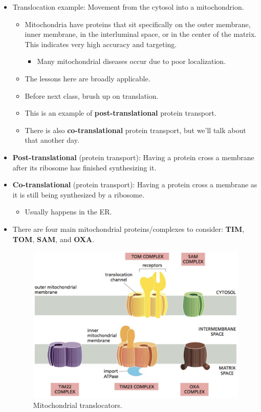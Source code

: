 \documentclass[../notes.tex]{subfiles}
\begin{document}
\begin{itemize}
    \item Translocation example: Movement from the cytosol into a mitochondrion.
    \begin{itemize}
        \item Mitochondria have proteins that sit specifically on the outer membrane, inner membrane, in the interluminal space, or in the center of the matrix. This indicates very high accuracy and targeting.
        \begin{itemize}
            \item Many mitochondrial diseases occur due to poor localization.
        \end{itemize}
        \item The lessons here are broadly applicable.
        \item Before next class, brush up on translation.
        \item This is an example of \textbf{post-translational} protein transport.
        \item There is also \textbf{co-translational} protein transport, but we'll talk about that another day.
    \end{itemize}
    \item \textbf{Post-translational} (protein transport): Having a protein cross a membrane after its ribosome has finished synthesizing it.
    \item \textbf{Co-translational} (protein transport): Having a protein cross a membrane as it is still being synthesized by a ribosome.
    \begin{itemize}
        \item Usually happens in the ER.
    \end{itemize}
    \item There are four main mitochondrial proteins/complexes to consider: \textbf{TIM}, \textbf{TOM}, \textbf{SAM}, and \textbf{OXA}.
    \begin{figure}[h!]
        \centering
        \includegraphics[width=0.5\linewidth]{../ExtFiles/MiTranslocators.png}
        \caption{Mitochondrial translocators.}

\end{figure}
\end{itemize}
\end{document}

